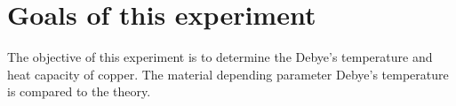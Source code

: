 \section{Goals of this experiment}
\label{sec:Zielsetzung}

The objective of this experiment is to determine the Debye's temperature and heat capacity of copper.
The material depending parameter Debye's temperature is compared to the theory.